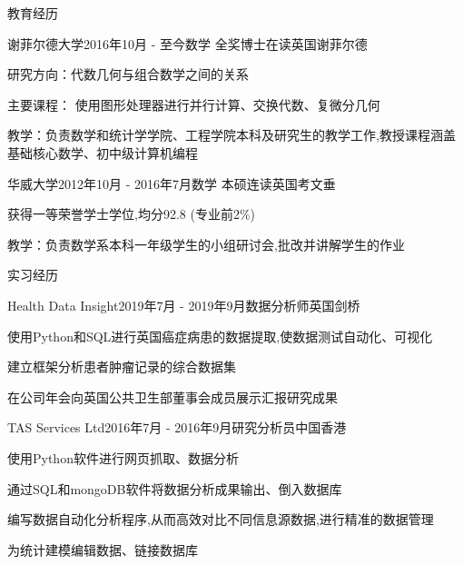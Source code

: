 \documentclass{zhresume} %
\begin{document}

\begin{rSection}{教育经历}

\begin{rSubsection}{谢菲尔德大学}{2016年10月 - 至今}{数学 全奖博士在读}{英国谢菲尔德}
\item 研究方向：代数几何与组合数学之间的关系
\item 主要课程： 使用图形处理器进行并行计算、交换代数、复微分几何
\item 教学：负责数学和统计学学院、工程学院本科及研究生的教学工作,教授课程涵盖基础核心数学、初中级计算机编程
\end{rSubsection}


\begin{rSubsection}{华威大学}{2012年10月 - 2016年7月}{数学 本硕连读}{英国考文垂}
\item 获得一等荣誉学士学位,均分92.8 (专业前2\%)
\item 教学：负责数学系本科一年级学生的小组研讨会,批改并讲解学生的作业
\end{rSubsection}

\end{rSection}


\begin{rSection}{实习经历}

\begin{rSubsection}{Health Data Insight}{2019年7月 - 2019年9月}{数据分析师}{英国剑桥}
\item 使用Python和SQL进行英国癌症病患的数据提取,使数据测试自动化、可视化
\item 建立框架分析患者肿瘤记录的综合数据集
\item 在公司年会向英国公共卫生部董事会成员展示汇报研究成果
\end{rSubsection}


\begin{rSubsection}{TAS Services Ltd}{2016年7月 - 2016年9月}{研究分析员}{中国香港}
\item 使用Python软件进行网页抓取、数据分析
\item 通过SQL和mongoDB软件将数据分析成果输出、倒入数据库
\item 编写数据自动化分析程序,从而高效对比不同信息源数据,进行精准的数据管理
\item 为统计建模编辑数据、链接数据库
\end{rSubsection}

\end{rSection}
\end{document}
